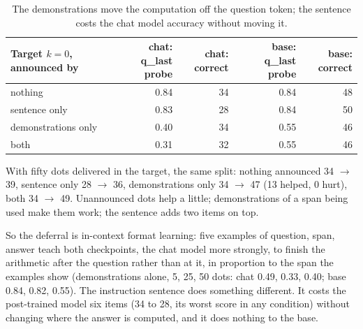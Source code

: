 \documentclass[11pt]{article}
\begin{document}
\begin{table}[h]\centering\small
\begin{tabular}{lrrrr}\toprule
Target $k=0$, announced by & chat: q\_last probe & chat: correct & base: q\_last probe & base: correct \\ \midrule
nothing & 0.84 & 34 & 0.84 & 48 \\
sentence only & 0.83 & 28 & 0.84 & 50 \\
demonstrations only & 0.40 & 34 & 0.55 & 46 \\
both & 0.31 & 32 & 0.55 & 46 \\ \bottomrule
\end{tabular}
\caption{The demonstrations move the computation off the question token; the sentence costs the chat model accuracy without moving it.}\end{table}

With fifty dots delivered in the target, the same split: nothing announced 34 $\to$ 39, sentence only 28 $\to$ 36, demonstrations only 34 $\to$ 47 (13 helped, 0 hurt), both 34 $\to$ 49. Unannounced dots help a little; demonstrations of a span being used make them work; the sentence adds two items on top.

So the deferral is in-context format learning: five examples of question, span, answer teach both checkpoints, the chat model more strongly, to finish the arithmetic after the question rather than at it, in proportion to the span the examples show (demonstrations alone, 5, 25, 50 dots: chat 0.49, 0.33, 0.40; base 0.84, 0.82, 0.55). The instruction sentence does something different. It costs the post-trained model six items (34 to 28, its worst score in any condition) without changing where the answer is computed, and it does nothing to the base.
\end{document}
